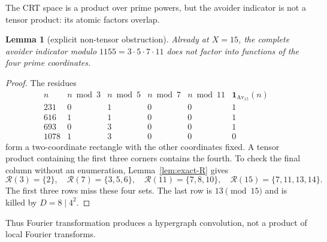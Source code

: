\documentclass[10pt,reqno]{amsart}
\newtheorem{lemma}[theorem]{Lemma}
\theoremstyle{definition}
\newcommand{\Rcal}{\mathscr R}
\newcommand{\Av}{\operatorname {Av}}
\newcommand{\1}{\mathbf 1}
\begin{document}
The CRT space is a product over prime powers, but the avoider indicator is not a tensor product: its atomic factors overlap.
\begin{lemma}[explicit non-tensor obstruction]\label{lem:nontensor}
Already at $X=15$, the complete avoider indicator modulo $1155=3\cdot5\cdot7\cdot11$ does not factor into functions of the four prime coordinates.
\end{lemma}
\begin{proof}
The residues
\[
\begin{array}{c|cc|cc|c}
 n&n\bmod3&n\bmod5&n\bmod7&n\bmod11&\1_{\Av_{15}}(n)\\ \hline
231&0&1&0&0&1\\
616&1&1&0&0&1\\
693&0&3&0&0&1\\
1078&1&3&0&0&0
\end{array}
\]
form a two-coordinate rectangle with the other coordinates fixed.  A tensor product containing the first three corners contains the fourth.  To check the final column without an enumeration, Lemma~\ref{lem:exact-R} gives
\[
 \Rcal(3)=\{2\},\quad \Rcal(7)=\{3,5,6\},\quad
 \Rcal(11)=\{7,8,10\},\quad \Rcal(15)=\{7,11,13,14\}.
\]
The first three rows miss these four sets.  The last row is $13\pmod{15}$ and is killed by $D=8\mid4^2$.
\end{proof}
Thus Fourier transformation produces a hypergraph convolution, not a product of local Fourier transforms.
\end{document}
